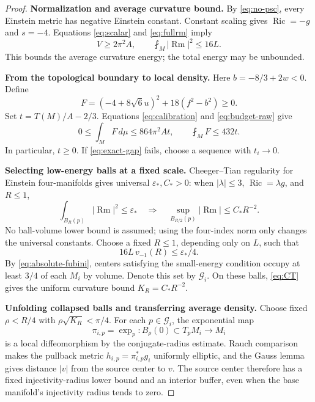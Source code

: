\documentclass[a4paper,11pt]{article}
\theoremstyle{paper}
\DeclareMathOperator{\Ric}{Ric}
\DeclareMathOperator{\Rm}{Rm}
\newcommand{\dd}{\,d\mu}
\newcommand{\av}{\fint}
\numberwithin{equation}{section}
\begin{document}
\begin{proof}
\textbf{Normalization and average curvature bound.}
By \eqref{eq:no-psc}, every Einstein metric has negative Einstein constant. Constant scaling gives $\Ric=-g$ and $s=-4$. Equations \eqref{eq:scalar} and \eqref{eq:fullrm} imply
\begin{equation}\label{eq:exact-curv-budget}
V\ge2\pi^2A,\qquad \av_M|\Rm|^2\le16L.
\end{equation}
This bounds the average curvature energy; the total energy may be unbounded.

\textbf{From the topological boundary to local density.}
Here $b=-8/3+2w<0$. Define
\[
F=(-4+8\sqrt6u)^2+18(f^2-b^2)\ge0.
\]
Set $t=T(M)/A-2/3$. Equations \eqref{eq:calibration} and \eqref{eq:budget-raw} give
\begin{equation}\label{eq:exact-F}
0\le\int_MF\dd\le864\pi^2At,\qquad \av_MF\le432t.
\end{equation}
In particular, $t\ge0$. If \eqref{eq:exact-gap} fails, choose a sequence with $t_i\to0$.

\textbf{Selecting low-energy balls at a fixed scale.}
Cheeger--Tian regularity for Einstein four-manifolds \cite{ct,gejiang} gives universal $\varepsilon_*,C_*>0$: when $|\lambda|\le3$, $\Ric=\lambda g$, and $R\le1$,
\begin{equation}\label{eq:CT}
\int_{B_R(p)}|\Rm|^2\le\varepsilon_*
\quad\Longrightarrow\quad
\sup_{B_{R/2}(p)}|\Rm|\le C_*R^{-2}.
\end{equation}
No ball-volume lower bound is assumed; using the four-index norm only changes the universal constants. Choose a fixed $R\le1$, depending only on $L$, such that
\[
16L\,v_{-1}(R)\le\varepsilon_*/4.
\]
By \eqref{eq:absolute-fubini}, centers satisfying the small-energy condition occupy at least $3/4$ of each $M_i$ by volume. Denote this set by $\mathcal G_i$. On these balls, \eqref{eq:CT} gives the uniform curvature bound $K_R=C_*R^{-2}$.

\textbf{Unfolding collapsed balls and transferring average density.}
Choose fixed $\rho<R/4$ with $\rho\sqrt{K_R}<\pi/4$. For each $p\in\mathcal G_i$, the exponential map
\[
\pi_{i,p}=\exp_p:B_\rho(0)\subset T_pM_i\longrightarrow M_i
\]
is a local diffeomorphism by the conjugate-radius estimate. Rauch comparison makes the pullback metric $h_{i,p}=\pi_{i,p}^*g_i$ uniformly elliptic, and the Gauss lemma gives distance $|v|$ from the source center to $v$. The source center therefore has a fixed injectivity-radius lower bound and an interior buffer, even when the base manifold's injectivity radius tends to zero.


\end{proof}
\end{document}

